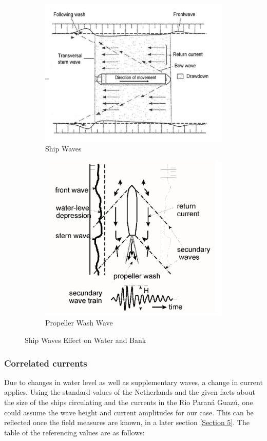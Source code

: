 \begin{figure}[H]
    \centering
    \begin{subfigure}[a]{0.48\linewidth}
        \centering
        \includegraphics[width=0.5\linewidth]{figures/ch2/shipwaves.png}
        \caption{Ship Waves}
        \label{fig:Ship Waves}
    \end{subfigure}
    
    \vspace{0.5cm}
    
    \begin{subfigure}[b]{0.48\linewidth}
        \centering
        \includegraphics[width=0.5\linewidth]{figures/ch2/shipsecond.png}
        \caption{Propeller Wash Wave}
        \label{fig:Prop Wash Wave}
    \end{subfigure}
    
    \caption{Ship Waves Effect on Water and Bank}
    \label{Fig:Ship Waves Effect on Water and Bank}
\end{figure}


\subsubsection{Correlated currents}

Due to changes in water level as well as supplementary waves, a change in current applies. Using the standard values of the Netherlands and the given facts about the size of the ships circulating and the currents in the Rio Paraná Guazú, one could assume the wave height and current amplitudes for our case. This can be reflected once the field measures are known, in a later section \ref{Section 5}.
The table of the referencing values are as follows:

